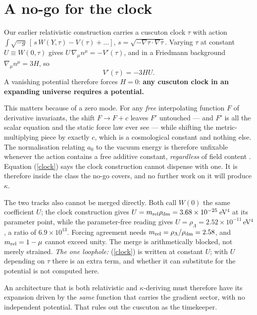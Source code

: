 \documentclass[11pt,letterpaper]{article}
\begin{document}
\section{A no-go for the clock}
Our earlier relativistic construction \cite{paper26} carries a cuscuton clock $\tau$ with action $\int\!\sqrt{-g}\,[\,s\,W(Y,\tau)-V(\tau)+\dots]$, $s=\sqrt{-\nabla\tau\cdot\nabla\tau}$. Varying $\tau$ at constant $U\equiv W(0,\tau)$ gives $U\,\nabla_\mu n^\mu=-V'(\tau)$, and in a Friedmann background $\nabla_\mu n^\mu=3H$, so
\begin{equation}
V'(\tau)=-3HU .
\label{clock}
\end{equation}
A vanishing potential therefore forces $H=0$: \textbf{any cuscuton clock in an expanding universe requires a potential.}

This matters because of a zero mode. For any \emph{free} interpolating function $F$ of derivative invariants, the shift $F\to F+c$ leaves $F'$ untouched --- and $F'$ is all the scalar equation and the static force law ever see --- while shifting the metric-multiplying piece by exactly $c$, which is a cosmological constant and nothing else. The normalisation relating $a_0$ to the vacuum energy is therefore unfixable whenever the action contains a free additive constant, \emph{regardless} of field content \cite{paper27}. Equation (\ref{clock}) says the clock construction cannot dispense with one. It is therefore inside the class the no-go covers, and no further work on it will produce $\kappa$.

The two tracks also cannot be merged directly. Both call $W(0)$ the same coefficient $U$; the clock construction gives $U=m_{\rm rel}\rho_{\rm dm}=3.68\times10^{-25}\,$eV$^4$ at its parameter point, while the parameter-free reading gives $U=\rho_\Lambda=2.52\times10^{-11}\,$eV$^4$, a ratio of $6.9\times10^{13}$. Forcing agreement needs $m_{\rm rel}=\rho_\Lambda/\rho_{\rm dm}=2.58$, and $m_{\rm rel}=1-\mu$ cannot exceed unity. The merge is arithmetically blocked, not merely strained. \emph{The one loophole:} (\ref{clock}) is written at constant $U$; with $U$ depending on $\tau$ there is an extra term, and whether it can substitute for the potential is not computed here.

An architecture that is both relativistic and $\kappa$-deriving must therefore have its expansion driven by the \emph{same} function that carries the gradient sector, with no independent potential. That rules out the cuscuton as the timekeeper.
\end{document}
